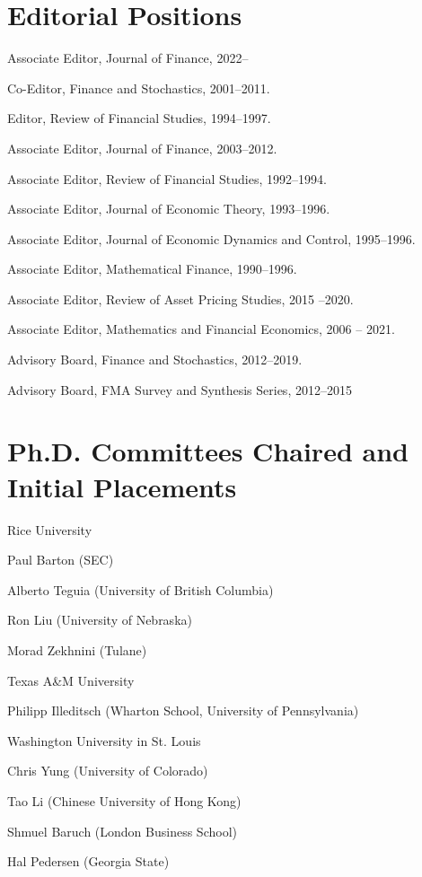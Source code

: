\documentclass[margin, 11pt]{res}
\newenvironment{list1}{
  \begin{list}{}{%
            \setlength{\itemsep}{0in}
      \setlength{\parsep}{0in} \setlength{\parskip}{0in}
      \setlength{\topsep}{0in} \setlength{\partopsep}{0in}
      \setlength{\leftmargin}{0.2in}}}{\end{list}}
\newenvironment{list3}{
  \begin{list}{}{%
            \setlength{\itemsep}{0in}
      \setlength{\parsep}{0in} \setlength{\parskip}{0in}
      \setlength{\topsep}{0in} \setlength{\partopsep}{0in}
      \setlength{\leftmargin}{0.2in}}}{\vspace*{.15in}\end{list}}
\begin{document}
\begin{resume}
\section{\sc Editorial Positions}
\begin{list1}
\item Associate Editor, Journal of Finance, 2022--
\item Co-Editor, Finance and Stochastics, 2001--2011.
\item Editor, Review of Financial Studies, 1994--1997.
\item Associate Editor, Journal of Finance, 2003--2012.
\item Associate Editor, Review of Financial Studies, 1992--1994.
\item Associate Editor, Journal of Economic Theory, 1993--1996.
\item Associate Editor, Journal of Economic Dynamics and Control,
1995--1996.
\item Associate Editor, Mathematical Finance, 1990--1996.
\item Associate Editor, Review of Asset Pricing Studies, 2015 --2020.
\item Associate Editor, Mathematics and Financial Economics, 2006 -- 2021.
\item Advisory Board, Finance and Stochastics, 2012--2019.
\item Advisory Board, FMA Survey and Synthesis Series, 2012--2015
\end{list1}

\section{\sc Ph.D. Committees Chaired and Initial Placements}
\begin{list1}
\item Rice University
\begin{list3}
\item Paul Barton (SEC)
\item  Alberto Teguia (University of British Columbia)
\item Ron Liu (University of Nebraska)
\item   Morad Zekhnini (Tulane)


\end{list3}
   \item Texas A\&M University
\begin{list3}
\item   Philipp Illeditsch (Wharton School, University of Pennsylvania)
\end{list3}
 \item Washington University in St. Louis
\begin{list3}
\item  Chris Yung (University of Colorado)
\item  Tao Li (Chinese University of Hong Kong)
\item    Shmuel Baruch (London Business School)
\item Hal Pedersen (Georgia State)


\end{list3}
\end{list1}
\end{resume}
\end{document}
